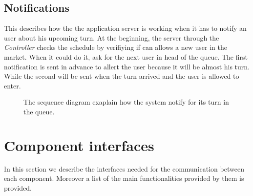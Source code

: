 \pagebreak

\subsection{Notifications}
This describes how the the application server is working when it has to notify an user about his upcoming turn. At the beginning, the server through the \textit{Controller} checks the schedule by verifiying if can allows a new user in the market. When it could do it, ask for the next user in head of the queue. The first notification is sent in advance to allert the user because it will be almost his turn. While the second will be sent when the turn arrived and the user is allowed to enter. 

\begin{figure}[H]
  \label{NotificationsSD}
  \centering
    \caption{The sequence diagram exaplain how the system notify for its turn in the queue.}
\end{figure} 

\pagebreak


\section{Component interfaces}
In this section we describe the interfaces needed for the communication between each component. Moreover a list of the main functionalities provided by them is provided.

